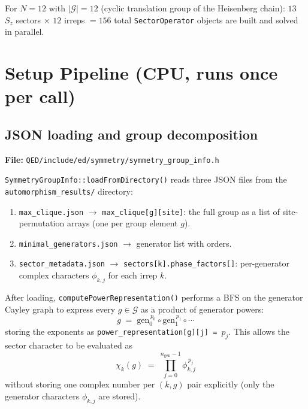 \documentclass[11pt,a4paper]{article}
\begin{document}
\medskip
For $N = 12$ with $|\mathcal{G}| = 12$ (cyclic translation group of the
Heisenberg chain): $13$ $S_z$ sectors $\times$ $12$ irreps $= 156$ total
\texttt{SectorOperator} objects are built and solved in parallel.

\section{Setup Pipeline (CPU, runs once per call)}
\label{sec:setup}

\subsection{JSON loading and group decomposition}

\textbf{File:} \texttt{QED/include/ed/symmetry/symmetry\_group\_info.h}

\medskip
\texttt{SymmetryGroupInfo::loadFromDirectory()} reads three JSON files from the
\texttt{automorphism\_results/} directory:

\begin{enumerate}
  \item \texttt{max\_clique.json} $\to$ \texttt{max\_clique[g][site]}: the full
    group as a list of site-permutation arrays (one per group element $g$).
  \item \texttt{minimal\_generators.json} $\to$ generator list with orders.
  \item \texttt{sector\_metadata.json} $\to$
    \texttt{sectors[k].phase\_factors[]}: per-generator complex characters
    $\phi_{k,j}$ for each irrep $k$.
\end{enumerate}

After loading, \texttt{computePowerRepresentation()} performs a BFS on the
generator Cayley graph to express every $g \in \mathcal{G}$ as a product of
generator powers:
\begin{equation}
  g \;=\; \mathrm{gen}_0^{\,p_0} \circ \mathrm{gen}_1^{\,p_1} \circ \cdots
  \label{eq:power_rep}
\end{equation}
storing the exponents as \texttt{power\_representation[g][j] = $p_j$}.
This allows the sector character to be evaluated as
\begin{equation}
  \chi_k(g) \;=\; \prod_{j=0}^{n_{\mathrm{gen}}-1} \phi_{k,j}^{\,p_j}
  \label{eq:character}
\end{equation}
without storing one complex number per $(k,g)$ pair explicitly (only the
generator characters $\phi_{k,j}$ are stored).
\end{document}
